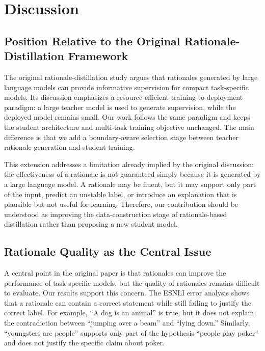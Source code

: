 \section{Discussion}
\label{sec:discussion}

\subsection{Position Relative to the Original Rationale-Distillation Framework}
\label{sec:discussion-position}

The original rationale-distillation study argues that rationales generated by large language models can provide informative supervision for compact task-specific models. Its discussion emphasizes a resource-efficient training-to-deployment paradigm: a large teacher model is used to generate supervision, while the deployed model remains small. Our work follows the same paradigm and keeps the student architecture and multi-task training objective unchanged. The main difference is that we add a boundary-aware selection stage between teacher rationale generation and student training.

This extension addresses a limitation already implied by the original discussion: the effectiveness of a rationale is not guaranteed simply because it is generated by a large language model. A rationale may be fluent, but it may support only part of the input, predict an unstable label, or introduce an explanation that is plausible but not useful for learning. Therefore, our contribution should be understood as improving the data-construction stage of rationale-based distillation rather than proposing a new student model.

\subsection{Rationale Quality as the Central Issue}
\label{sec:discussion-quality}

A central point in the original paper is that rationales can improve the performance of task-specific models, but the quality of rationales remains difficult to evaluate. Our results support this concern. The ESNLI error analysis shows that a rationale can contain a correct statement while still failing to justify the correct label. For example, ``A dog is an animal'' is true, but it does not explain the contradiction between ``jumping over a beam'' and ``lying down.'' Similarly, ``youngsters are people'' supports only part of the hypothesis ``people play poker'' and does not justify the specific claim about poker.

